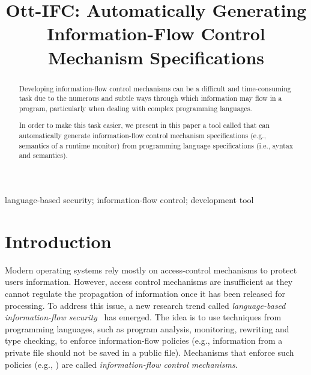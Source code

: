 \documentclass[conference]{IEEEtran}
\begin{document}
\title{Ott-IFC: Automatically Generating Information-Flow Control Mechanism Specifications}


\maketitle

\begin{abstract}
	Developing information-flow control mechanisms can be a difficult and time-consuming task due to the numerous and subtle ways through which information may flow in a program, particularly when dealing with complex programming languages. 
	
	In order to make this task easier, we present in this paper a tool called \emph{\ottifc} that can automatically generate information-flow control mechanism specifications (e.g., semantics of a runtime monitor) from programming language specifications (i.e., syntax and semantics).
\end{abstract}

\begin{IEEEkeywords}
	language-based security; information-flow control; development tool
\end{IEEEkeywords}

\section{Introduction}
Modern operating systems rely mostly on access-control mechanisms to protect users information. However, access control mechanisms are insufficient as they cannot regulate the propagation of information once it has been released for processing. To address this issue, a new research trend called \emph{language-based information-flow security}~\cite{DBLP:journals/jsac/SabelfeldM03} has emerged. The idea is to use techniques from programming languages, such as program analysis, monitoring, rewriting and type checking, to enforce information-flow policies (e.g., information from a private file should not be saved in a public file). Mechanisms that enforce such policies (e.g., \cite{DBLP:journals/jcs/VolpanoIS96, DBLP:conf/csfw/ChudnovN10,DBLP:conf/csfw/AskarovCM15,DBLP:journals/compsec/BedfordCDKT17}) are called \emph{information-flow control mechanisms}. 
\end{document}
